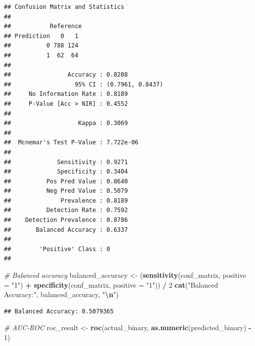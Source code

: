 \documentclass[
]{article}
\newenvironment{Shaded}{\begin{snugshade}}{\end{snugshade}}
\newcommand{\AttributeTok}[1]{\textcolor[rgb]{0.13,0.29,0.53}{#1}}
\newcommand{\CommentTok}[1]{\textcolor[rgb]{0.56,0.35,0.01}{\textit{#1}}}
\newcommand{\DecValTok}[1]{\textcolor[rgb]{0.00,0.00,0.81}{#1}}
\newcommand{\FunctionTok}[1]{\textcolor[rgb]{0.13,0.29,0.53}{\textbf{#1}}}
\newcommand{\NormalTok}[1]{#1}
\newcommand{\OtherTok}[1]{\textcolor[rgb]{0.56,0.35,0.01}{#1}}
\newcommand{\SpecialCharTok}[1]{\textcolor[rgb]{0.81,0.36,0.00}{\textbf{#1}}}
\newcommand{\StringTok}[1]{\textcolor[rgb]{0.31,0.60,0.02}{#1}}
\begin{document}
\begin{verbatim}
## Confusion Matrix and Statistics
## 
##           Reference
## Prediction   0   1
##          0 788 124
##          1  62  64
##                                           
##                Accuracy : 0.8208          
##                  95% CI : (0.7961, 0.8437)
##     No Information Rate : 0.8189          
##     P-Value [Acc > NIR] : 0.4552          
##                                           
##                   Kappa : 0.3069          
##                                           
##  Mcnemar's Test P-Value : 7.722e-06       
##                                           
##             Sensitivity : 0.9271          
##             Specificity : 0.3404          
##          Pos Pred Value : 0.8640          
##          Neg Pred Value : 0.5079          
##              Prevalence : 0.8189          
##          Detection Rate : 0.7592          
##    Detection Prevalence : 0.8786          
##       Balanced Accuracy : 0.6337          
##                                           
##        'Positive' Class : 0               
## 
\end{verbatim}

\begin{Shaded}
\begin{Highlighting}[]
\CommentTok{\# Balanced accuracy}
\NormalTok{balanced\_accuracy }\OtherTok{\textless{}{-}}\NormalTok{ (}\FunctionTok{sensitivity}\NormalTok{(conf\_matrix, }\AttributeTok{positive =} \StringTok{"1"}\NormalTok{) }\SpecialCharTok{+}
                        \FunctionTok{specificity}\NormalTok{(conf\_matrix, }\AttributeTok{positive =} \StringTok{"1"}\NormalTok{)) }\SpecialCharTok{/} \DecValTok{2}
\FunctionTok{cat}\NormalTok{(}\StringTok{"Balanced Accuracy:"}\NormalTok{, balanced\_accuracy, }\StringTok{"}\SpecialCharTok{\textbackslash{}n}\StringTok{"}\NormalTok{)}
\end{Highlighting}
\end{Shaded}

\begin{verbatim}
## Balanced Accuracy: 0.5079365
\end{verbatim}

\begin{Shaded}
\begin{Highlighting}[]
\CommentTok{\# AUC{-}ROC}
\NormalTok{roc\_result }\OtherTok{\textless{}{-}} \FunctionTok{roc}\NormalTok{(actual\_binary, }\FunctionTok{as.numeric}\NormalTok{(predicted\_binary) }\SpecialCharTok{{-}} \DecValTok{1}\NormalTok{)}
\end{Highlighting}
\end{Shaded}
\end{document}
